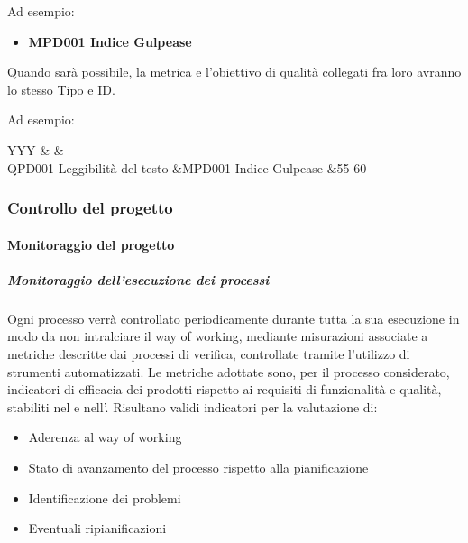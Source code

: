 			Ad esempio:
			
			\begin{itemize}
				\item \textbf{MPD001 Indice Gulpease}
			\end{itemize}
		
			Quando sarà possibile, la metrica e l'obiettivo di qualità collegati fra loro avranno lo stesso Tipo e ID.
			
			Ad esempio:
		
			\begin{table}[H]
				\begin{detailtable}{\columnwidth}{YYY}
					 &
					 &
					\\
					\hline{}
					QPD001 Leggibilità del testo &MPD001 Indice Gulpease &55-60\\
					\hline{}
				\end{detailtable}
			\end{table}
			
		\subsubsection{Controllo del progetto}

			\paragraph{Monitoraggio del progetto}

			\subparagraph{Monitoraggio dell'esecuzione dei processi}
			Ogni processo verrà controllato periodicamente durante tutta la sua esecuzione in modo da non intralciare il way of working,
			mediante misurazioni associate a metriche descritte dai processi di verifica, controllate tramite l'utilizzo di strumenti automatizzati.
			Le metriche adottate sono, per il processo considerato, indicatori di efficacia dei prodotti rispetto ai requisiti di funzionalità e qualità,
			stabiliti nel  e nell'. Risultano validi indicatori per la valutazione di:
			\begin{itemize}
				\item Aderenza al way of working
				\item Stato di avanzamento del processo rispetto alla pianificazione
				\item Identificazione dei problemi
				\item Eventuali ripianificazioni
			\end{itemize}

